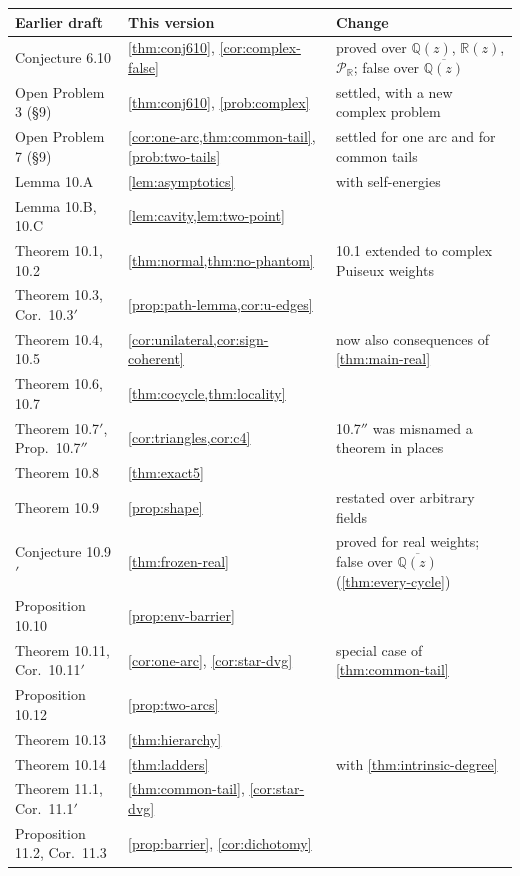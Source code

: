 \documentclass[final]{siamart0516}
\numberwithin{theorem}{section}
\numberwithin{equation}{section}
\theoremstyle{siamnonum}
\theoremstyle{plain}
\newcommand{\QQ}{\mathbb{Q}}
\newcommand{\RR}{\mathbb{R}}
\newcommand{\Qz}{\QQ(z)}
\newcommand{\Rz}{\RR(z)}
\newcommand{\Qzbar}{\overline{\QQ(z)}}
\newcommand{\Puis}{\mathcal{P}_{\RR}}
\begin{document}
\begin{center}\small
\begin{longtable}{@{}L{0.29}L{0.33}L{0.31}@{}}
\toprule
Earlier draft & This version & Change\\ \midrule\endhead
Conjecture 6.10 & \cref{thm:conj610}, \cref{cor:complex-false} & proved over $\Qz$, $\Rz$, $\Puis$; false over $\Qzbar$\\
Open Problem 3 (\S9) & \cref{thm:conj610}, \cref{prob:complex} & settled, with a new complex problem\\
Open Problem 7 (\S9) & \cref{cor:one-arc,thm:common-tail}, \cref{prob:two-tails} & settled for one arc and for common tails\\
Lemma 10.A & \cref{lem:asymptotics} & with self-energies\\
Lemma 10.B, 10.C & \cref{lem:cavity,lem:two-point} & \\
Theorem 10.1, 10.2 & \cref{thm:normal,thm:no-phantom} & 10.1 extended to complex Puiseux weights\\
Theorem 10.3, Cor.\ 10.3$'$ & \cref{prop:path-lemma,cor:u-edges} & \\
Theorem 10.4, 10.5 & \cref{cor:unilateral,cor:sign-coherent} & now also consequences of \cref{thm:main-real}\\
Theorem 10.6, 10.7 & \cref{thm:cocycle,thm:locality} & \\
Theorem 10.7$'$, Prop.\ 10.7$''$ & \cref{cor:triangles,cor:c4} & 10.7$''$ was misnamed a theorem in places\\
Theorem 10.8 & \cref{thm:exact5} & \\
Theorem 10.9 & \cref{prop:shape} & restated over arbitrary fields\\
Conjecture 10.9$'$ & \cref{thm:frozen-real} & proved for real weights; false over $\Qzbar$ (\cref{thm:every-cycle})\\
Proposition 10.10 & \cref{prop:env-barrier} & \\
Theorem 10.11, Cor.\ 10.11$'$ & \cref{cor:one-arc}, \cref{cor:star-dvg} & special case of \cref{thm:common-tail}\\
Proposition 10.12 & \cref{prop:two-arcs} & \\
Theorem 10.13 & \cref{thm:hierarchy} & \\
Theorem 10.14 & \cref{thm:ladders} & with \cref{thm:intrinsic-degree}\\
Theorem 11.1, Cor.\ 11.1$'$ & \cref{thm:common-tail}, \cref{cor:star-dvg} & \\
Proposition 11.2, Cor.\ 11.3 & \cref{prop:barrier}, \cref{cor:dichotomy} & \\

\end{longtable}
\end{center}
\end{document}
